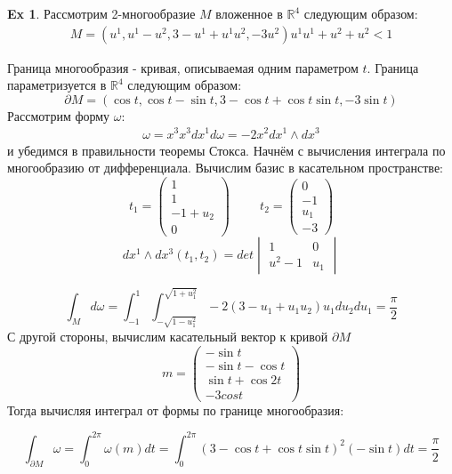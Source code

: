 \documentclass{article}
\theoremstyle{definition}
\newtheorem{example}{Ex}
\begin{document}
\begin{example}
	Рассмотрим 2-многообразие $M$ вложенное в $\mathbb{R}^4$ следующим образом:	
	\begin{gather}
	M = (u^1, u^1 - u^2, 3 - u^1+u^1u^2, -3u^2)
	u^1u^1+u^2+u^2<1
	\end{gather}
	
Граница многообразия - кривая, описываемая одним параметром $t$. Граница параметризуется в $\mathbb{R}^4$ следующим образом:
\begin{equation}
	\partial M = (\cos t, \cos t - \sin t, 3 - \cos t+ \cos t \sin t, -3 \sin t)
\end{equation}
Рассмотрим форму $\omega$:
\begin{gather}
 \omega = x^3 x^3 dx^1
 d \omega = -2x^2 dx^1 \wedge d x^3
\end{gather}
и убедимся в правильности теоремы Стокса. Начнём с вычисления интеграла по многообразию от дифференциала. Вычислим базис в касательном пространстве:
\begin{equation}
t_1=\begin{pmatrix} 1 \\ 1 \\ -1 + u_2 \\ 0\end{pmatrix} \hspace{1cm} t_2 = \begin{pmatrix}
0\\ -1 \\ u_1 \\-3
\end{pmatrix}
\end{equation}
\begin{equation}
dx^1 \wedge dx^3 (t_1, t_2) = det \begin{vmatrix} 1 & 0 \\ u^2-1 & u_1\end{vmatrix}
\end{equation}

\begin{equation}
\int_M d \omega = \int_{-1}^{1} \int_{-\sqrt{1-u_1^2}}^{\sqrt{1+u_1^2}} -2(3-u_1+u_1u_2)u_1 du_2 du_1 = \frac{\pi}{2}
\end{equation}
С другой стороны, вычислим касательный вектор к кривой $\partial M$
\begin{equation}
m = \begin{pmatrix} -\sin t \\ -\sin t - \cos t \\ \sin t + \cos 2t \\ -3 cos t\end{pmatrix}
\end{equation}
Тогда вычисляя интеграл от формы по границе многообразия:

\begin{equation}
\int_{\partial M} \omega = \int_0^{2\pi} \omega(m) dt = \int_0^{2\pi} (3-\cos t + \cos t \sin t)^2 (-\sin t)dt = \frac{\pi}2
\end{equation}
\end{example}
\end{document}
